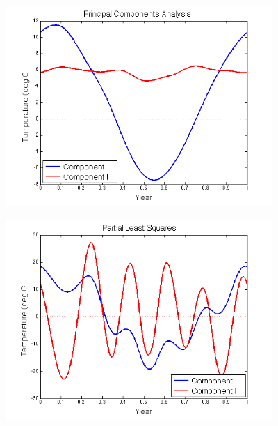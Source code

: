 \documentclass[11pt]{beamer}
\begin{document}
\begin{frame}

\begin{center}
\includegraphics[width=4in]{figs/Daily_PCA_Components.png}
\end{center}

\end{frame}


\begin{frame}

\begin{center}
\includegraphics[width=4in]{figs/Daily_PLS_Components.png}
\end{center}

\end{frame}

\end{document}
